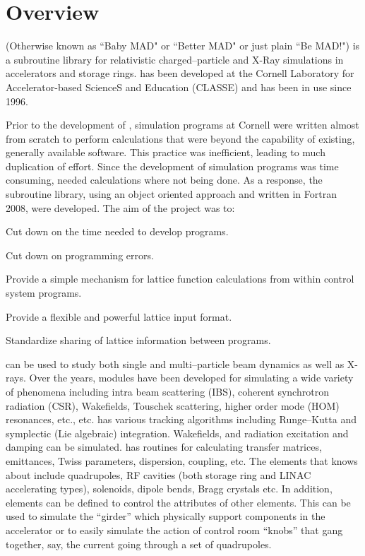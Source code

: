 \section*{Overview}

\bmad (Otherwise known as ``Baby MAD" or ``Better MAD" or just plain ``Be MAD!") is a subroutine
library for relativistic charged--particle and X-Ray simulations in accelerators and storage
rings. \bmad has been developed at the Cornell Laboratory for Accelerator-based ScienceS and
Education (CLASSE) and has been in use since 1996.

Prior to the development of \bmad, simulation programs at Cornell were written almost from scratch
to perform calculations that were beyond the capability of existing, generally available software.
This practice was inefficient, leading to much duplication of effort. Since the development of
simulation programs was time consuming, needed calculations where not being done. As a response, the
\bmad subroutine library, using an object oriented approach and written in Fortran 2008, were
developed.  The aim of the \bmad project was to:
\begin{Itemize}
\item Cut down on the time needed to develop programs.
\item Cut down on programming errors.
\item Provide a simple mechanism for lattice function calculations
from within control system programs.
\item Provide a flexible and powerful lattice input format.
\item Standardize sharing of lattice information between 
programs.
\end{Itemize}

\bmad can be used to study both single and multi--particle beam dynamics as well as X-rays.  Over
the years, \bmad modules have been developed for simulating a wide variety of phenomena including
intra beam scattering (IBS), coherent synchrotron radiation (CSR), Wakefields, Touschek scattering,
higher order mode (HOM) resonances, etc., etc.  \bmad has various tracking algorithms including
Runge--Kutta and symplectic (Lie algebraic) integration. Wakefields, and radiation excitation and
damping can be simulated. \bmad has routines for calculating transfer matrices, emittances, Twiss
parameters, dispersion, coupling, etc. The elements that \bmad knows about include quadrupoles, RF
cavities (both storage ring and LINAC accelerating types), solenoids, dipole bends, Bragg crystals
etc.  In addition, elements can be defined to control the attributes of other elements. This can be
used to simulate the ``girder'' which physically support components in the accelerator or to easily
simulate the action of control room ``knobs'' that gang together, say, the current going through a
set of quadrupoles.

